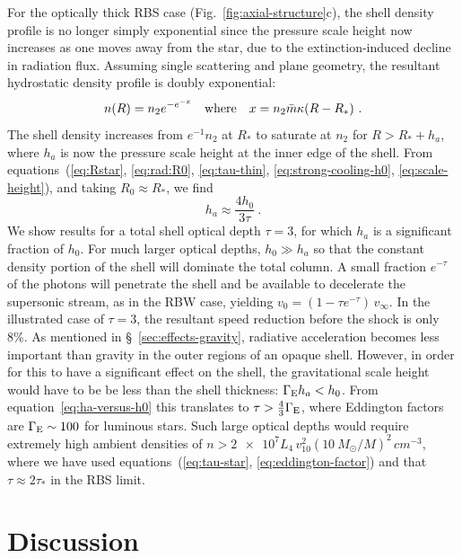 For the optically thick RBS case (Fig.~\ref{fig:axial-structure}c),
the shell density profile is no longer simply exponential since the
pressure scale height now increases as one moves away from the star,
due to the extinction-induced decline in radiation flux. Assuming
single scattering and plane geometry, the resultant hydrostatic
density profile is doubly exponential:
\begin{equation}
  \label{eq:rbs-density-profile}
  n(R) = n_2 e^{-e^{-x}} \text{\quad where\quad } x = n_2 \bar{m} \kappa (R - R_*) \ . 
\end{equation}
The shell density increases from \(e^{-1} n_2\) at \(R_*\) to saturate
at \(n_2\) for \(R > R_* + h_a\), where \(h_a\) is now the pressure
scale height at the inner edge of the shell.  From
equations~(\ref{eq:Rstar}, \ref{eq:rad:R0}, \ref{eq:tau-thin},
\ref{eq:strong-cooling-h0}, \ref{eq:scale-height}), and taking \(R_0 \approx R_*\), we find
\begin{equation}
  \label{eq:ha-versus-h0}
  h_a \approx \frac{4 h_0}{3 \tau} \ .
\end{equation}
We show results for a total shell optical depth \(\tau = 3\), for which
\(h_a\) is a significant fraction of \(h_0\).  For much larger optical
depths, \(h_0 \gg h_a\) so that the constant density portion of the
shell will dominate the total column.  A small fraction \(e^{-\tau}\) of
the photons will penetrate the shell and be available to decelerate
the supersonic stream, as in the RBW case, yielding
\(v_0 = (1 - \tau e^{-\tau})\, v_\infty\).  In the illustrated case of
\(\tau = 3\), the resultant speed reduction before the shock is only 8\%.
As mentioned in \S~\ref{sec:effects-gravity}, radiative acceleration
becomes less important than gravity in the outer regions of an opaque
shell.  However, in order for this to have a significant effect on the
shell, the gravitational scale height would have to be be less than
the shell thickness: \(\Gamma_{\text{E}} h_a < h_0\).  From
equation~\eqref{eq:ha-versus-h0} this translates to
\(\tau > \frac43 \Gamma_{\text{E}}\), where Eddington factors are
\(\Gamma_{\text{E}} \sim 100\) for luminous stars.  Such large optical depths would
require extremely high ambient densities of
\(n > \num{2e7} L_4 \,v_{10}^2 \left( \SI{10}{M_\odot}/M \right)^2 \,
\si{cm^{-3}} \), where we have used equations~(\ref{eq:tau-star},
\ref{eq:eddington-factor}) and that \(\tau \approx 2\tau_*\) in the RBS limit.

\section{Discussion}
\label{sec:discussion}

